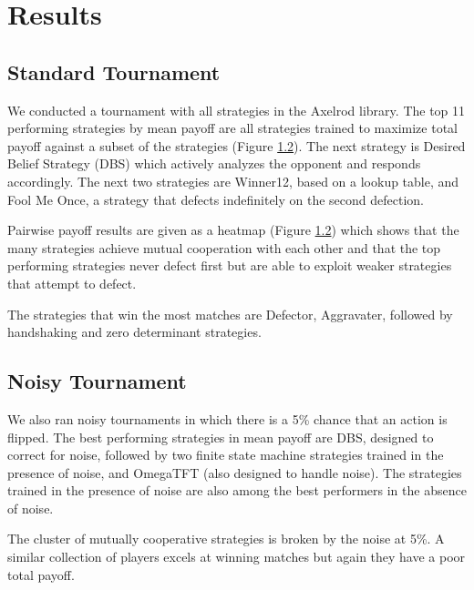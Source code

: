 \documentclass{article}
\begin{document}
\section{Results}

\subsection{Standard Tournament}

We conducted a tournament with all strategies in the Axelrod library. The top
11 performing strategies by mean payoff are all strategies trained to maximize
total payoff against a subset of the strategies (Figure \ref{}). The next strategy is 
Desired Belief Strategy (DBS) which actively analyzes the opponent and responds
accordingly. The next two strategies are Winner12, based on a lookup table, and
Fool Me Once, a strategy that defects indefinitely on the second defection.

Pairwise payoff results are given as a heatmap (Figure \ref{}) which
shows that the many strategies achieve mutual cooperation with each other and
that the top performing strategies never defect first but are able to exploit
weaker strategies that attempt to defect.

The strategies that win the most matches are Defector, Aggravater, followed by
handshaking and zero determinant strategies.


\subsection{Noisy Tournament}

We also ran noisy tournaments in which there is a 5\% chance that an action
is flipped. The best performing strategies in mean payoff are DBS, designed
to correct for noise, followed by two finite state machine strategies trained
in the presence of noise, and OmegaTFT (also designed to handle noise). The
strategies trained in the presence of noise are also among the best performers
in the absence of noise.

The cluster of mutually cooperative strategies is broken by the noise at 5\%. A
similar collection of players excels at winning matches but again they have
a poor total payoff.

\end{document}
